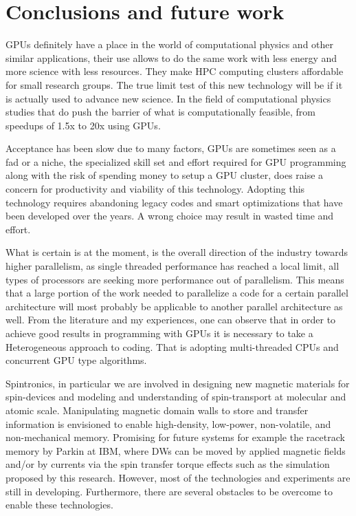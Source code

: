 
\chapter{Conclusions and future work} %

\label{Conclusions and future work} %


GPUs definitely have a place in the world of computational physics and other similar applications, their use allows to do the same work with less energy and more science with less resources. They make HPC computing clusters affordable for small research groups. The true limit test of this new technology will be if it is actually used to advance new science. In the field of computational physics studies that do push the barrier of what is computationally feasible, from speedups of 1.5x to 20x using GPUs\cite{applications}.

Acceptance has been slow due to many factors, GPUs are sometimes seen as a fad or a niche, the specialized skill set and effort required for GPU programming along with the risk of spending money to setup a GPU cluster, does raise a concern for productivity and viability of this technology. Adopting this technology requires abandoning legacy codes and smart optimizations that have been developed over the years. A wrong choice may result in wasted time and effort.

What is certain is at the moment, is the overall direction of the industry towards higher parallelism, as single threaded performance has reached a local limit, all types of processors are seeking more performance out of parallelism. This means that a large portion of the work needed to parallelize a code for a certain parallel architecture will most probably be applicable to another parallel architecture as well. From the literature and my experiences, one can observe that in order to achieve good results in programming with GPUs it is necessary to take a Heterogeneous approach to coding. That is adopting multi-threaded CPUs and concurrent GPU type algorithms.

Spintronics, in particular we are involved in designing new magnetic materials for spin-devices and modeling and understanding of spin-transport at molecular and atomic scale. Manipulating magnetic domain walls to store and transfer information is envisioned to enable high-density, low-power, non-volatile, and non-mechanical memory. Promising for future systems for example the racetrack memory by Parkin at IBM, where DWs can be moved by applied magnetic fields and/or by currents via the spin transfer torque effects such as the simulation proposed by this research. However, most of the technologies and experiments  are still in developing. Furthermore, there are several obstacles to be overcome to enable these technologies.

